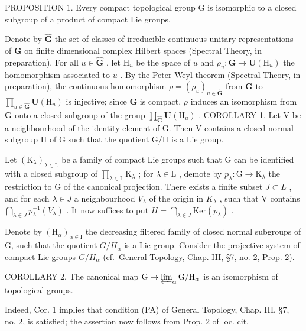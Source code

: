 

PROPOSITION 1. Every compact topological group G is isomorphic to a closed subgroup of a product of compact Lie groups.

Denote by \(\hat{\mathbf{G}}\) the set of classes of irreducible continuous unitary representations of \(\mathbf{G}\) on finite dimensional complex Hilbert spaces (Spectral Theory, in preparation). For all \(u\in \hat{\mathbf{G}}\) , let \(\mathrm{H}_u\) be the space of \(u\) and \(\rho_{u}:\mathbf{G}\to \mathbf{U}(\mathrm{H}_{u})\) the homomorphism associated to \(u\) . By the Peter-Weyl theorem (Spectral Theory, in preparation), the continuous homomorphism \(\rho = (\rho_u)_{u\in \hat{\mathbf{G}}}\) from \(\mathbf{G}\) to \(\prod_{u\in \hat{\mathbf{G}}}\mathbf{U}(\mathrm{H}_u)\) is injective; since \(\mathbf{G}\) is compact, \(\rho\) induces an isomorphism from \(\mathbf{G}\) onto a closed subgroup of the group \(\prod_{\hat{\mathbf{G}}} \mathbf{U}(\mathrm{H}_u)\) .
COROLLARY 1. Let V be a neighbourhood of the identity element of G. Then V contains a closed normal subgroup H of G such that the quotient G/H is a Lie group.

Let \((\mathrm{K}_{\lambda})_{\lambda \in \mathrm{L}}\) be a family of compact Lie groups such that \(\mathrm{G}\) can be identified with a closed subgroup of \(\prod_{\lambda \in \mathrm{L}}\mathrm{K}_{\lambda}\) ; for \(\lambda \in \mathrm{L}\) , demote by \(p_{\lambda}:\mathrm{G}\to \mathrm{K}_{\lambda}\) the restriction to G of the canonical projection. There exists a finite subset \(J \subset L\) , and for each \(\lambda \in J\) a neighbourhood \(V_{\lambda}\) of the origin in \(K_{\lambda}\) , such that V contains \(\bigcap_{\lambda \in J} p_{\lambda}^{-1}(V_{\lambda})\) . It now suffices to put \(H = \bigcap_{\lambda \in J} \text{Ker}(p_{\lambda})\) .

Denote by \((\mathrm{H}_{\alpha})_{\alpha\in\mathrm{I}}\) the decreasing filtered family of closed normal subgroups of G, such that the quotient \(G/H_{\alpha}\) is a Lie group. Consider the projective system of compact Lie groups \(G/H_{\alpha}\) (cf.~General Topology, Chap. III, §7, no. 2, Prop. 2).

COROLLARY 2. The canonical map \(\mathrm{G} \to \varprojlim_{\alpha} \mathrm{G} / \mathrm{H}_{\alpha}\) is an isomorphism of topological groups.

Indeed, Cor. 1 implies that condition (PA) of General Topology, Chap. III, §7, no. 2, is satisfied; the assertion now follows from Prop. 2 of loc. cit.

